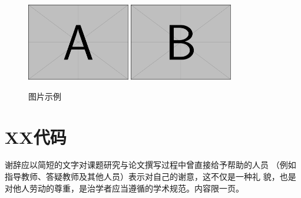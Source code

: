 \documentclass{swufethesis}
\begin{document}
\begin{figure}[htb]
  \centering
  \includegraphics[width=0.4\textwidth]{figures/example-image-a.pdf}
  \includegraphics[width=0.4\textwidth]{figures/example-image-b.pdf}
  \caption{图片示例}
\end{figure}

\printbibliography
\appendix
\chapter{XX代码}
\begin{acknowledgments}
  谢辞应以简短的文字对课题研究与论文撰写过程中曾直接给予帮助的人员
  （例如指导教师、答疑教师及其他人员）表示对自己的谢意，这不仅是一种礼
  貌，也是对他人劳动的尊重，是治学者应当遵循的学术规范。内容限一页。
\end{acknowledgments}
\end{document}
